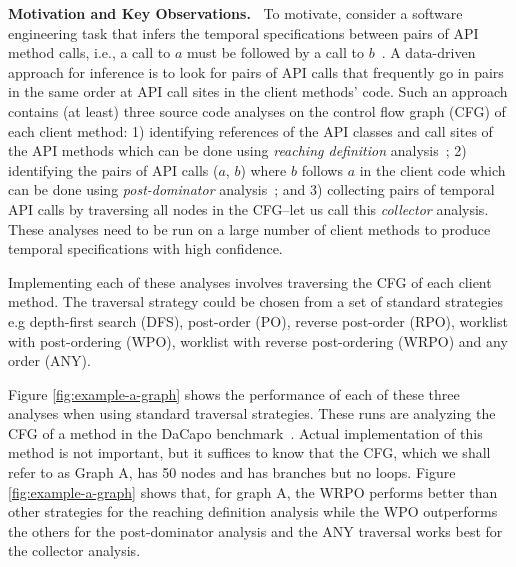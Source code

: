 {\bf Motivation and Key Observations.\ }
To motivate, consider a software engineering task that infers the temporal 
specifications between pairs of API method calls, i.e., a call to $a$ must be 
followed by a call to $b$~\cite{engler-sosp2001,ramanathan-icse2007,weimer-tacas2005,yang-icse2006}. 
A data-driven approach for inference is to look for pairs of API calls that frequently go in pairs in 
the same order at API call sites in the client methods' code. Such an 
approach contains (at least) three source code analyses on the control flow graph 
(CFG) of each client method: 
%
1) identifying references of the API classes and call sites of the API 
methods which can be done using \emph{reaching definition} analysis~\cite{programanalysis}; 
%
2) identifying the pairs of API calls ($a$, $b$) where $b$ follows $a$ in the 
client code which can be done using \emph{post-dominator} analysis~\cite{compilers}; and 
%
3) collecting pairs of temporal API calls by traversing all nodes in the 
CFG--let us call this \emph{collector} analysis. 
%
These analyses need to be run on a large number of client methods to 
produce temporal specifications with high confidence.

Implementing each of these analyses involves traversing the CFG 
of each client method. The traversal strategy could be chosen from a 
set of standard strategies e.g depth-first search (DFS), post-order 
(PO), reverse post-order (RPO), worklist with post-ordering (WPO), 
worklist with reverse post-ordering (WRPO) and any order (ANY).

Figure \ref{fig:example-a-graph} shows the performance of each of these three 
analyses when using standard traversal strategies.
These runs are analyzing the CFG of a method in the DaCapo 
benchmark~\cite{blackburn2006dacapo}. 
Actual implementation of this method is not important, but it suffices
to know that the CFG, which we shall refer to as Graph A, has 50 nodes
and has branches but no loops. Figure \ref{fig:example-a-graph} shows
that, for graph A, the WRPO performs better than other strategies for
the reaching definition analysis while the WPO outperforms the others
for the post-dominator analysis and the ANY traversal works best for
the collector analysis.

